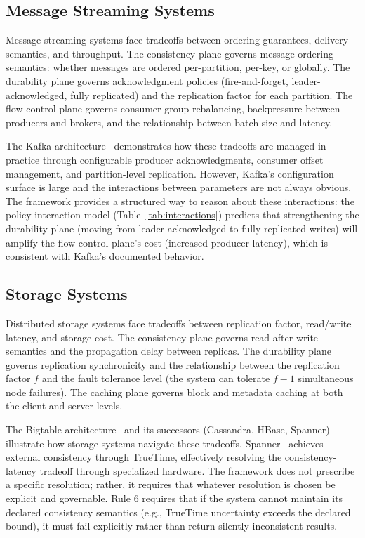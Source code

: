 \documentclass[conference]{IEEEtran}
\begin{document}
\subsection{Message Streaming Systems}

Message streaming systems face tradeoffs between ordering guarantees, delivery semantics, and throughput. The consistency plane governs message ordering semantics: whether messages are ordered per-partition, per-key, or globally. The durability plane governs acknowledgment policies (fire-and-forget, leader-acknowledged, fully replicated) and the replication factor for each partition. The flow-control plane governs consumer group rebalancing, backpressure between producers and brokers, and the relationship between batch size and latency.

The Kafka architecture~\cite{kafka} demonstrates how these tradeoffs are managed in practice through configurable producer acknowledgments, consumer offset management, and partition-level replication. However, Kafka's configuration surface is large and the interactions between parameters are not always obvious. The framework provides a structured way to reason about these interactions: the policy interaction model (Table~\ref{tab:interactions}) predicts that strengthening the durability plane (moving from leader-acknowledged to fully replicated writes) will amplify the flow-control plane's cost (increased producer latency), which is consistent with Kafka's documented behavior.

\subsection{Storage Systems}

Distributed storage systems face tradeoffs between replication factor, read/write latency, and storage cost. The consistency plane governs read-after-write semantics and the propagation delay between replicas. The durability plane governs replication synchronicity and the relationship between the replication factor $f$ and the fault tolerance level (the system can tolerate $f-1$ simultaneous node failures). The caching plane governs block and metadata caching at both the client and server levels.

The Bigtable architecture~\cite{bigtable} and its successors (Cassandra, HBase, Spanner) illustrate how storage systems navigate these tradeoffs. Spanner~\cite{spanner} achieves external consistency through TrueTime, effectively resolving the consistency-latency tradeoff through specialized hardware. The framework does not prescribe a specific resolution; rather, it requires that whatever resolution is chosen be explicit and governable. Rule 6 requires that if the system cannot maintain its declared consistency semantics (e.g., TrueTime uncertainty exceeds the declared bound), it must fail explicitly rather than return silently inconsistent results.
\end{document}
